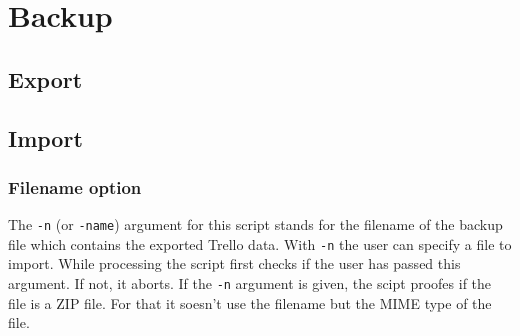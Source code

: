 








\section{Backup}







\subsection{Export}

\subsection{Import}

\subsubsection{Filename option}
The \texttt{-n} (or \texttt{-name}) argument for this script stands for the filename of the backup file which contains the  exported Trello data. With \texttt{-n} the user can specify a file to import. While processing the script first checks if the user has passed this argument. If not, it aborts. If the \texttt{-n} argument is given, the scipt proofes if the file is a ZIP file. For that it soesn't use the filename but the MIME type of the file.


